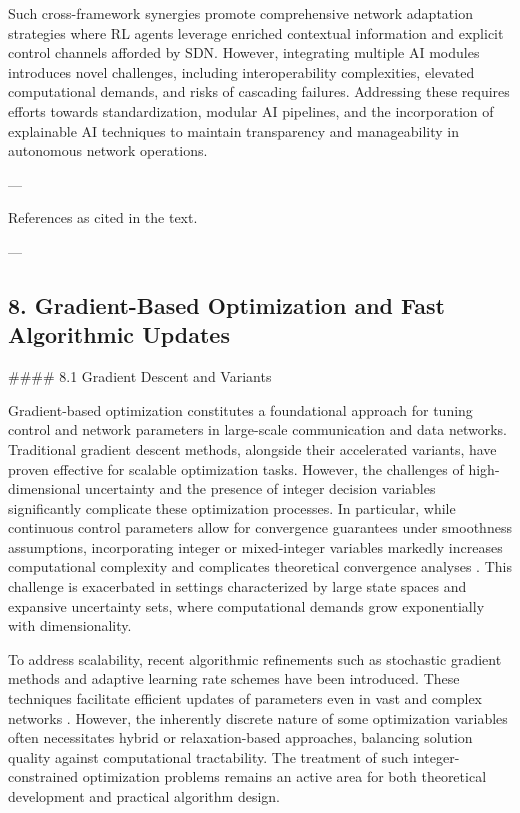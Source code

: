 \documentclass[11pt]{article}
\begin{document}
\begin{itemize}
Such cross-framework synergies promote comprehensive network adaptation strategies where RL agents leverage enriched contextual information and explicit control channels afforded by SDN. However, integrating multiple AI modules introduces novel challenges, including interoperability complexities, elevated computational demands, and risks of cascading failures. Addressing these requires efforts towards standardization, modular AI pipelines, and the incorporation of explainable AI techniques to maintain transparency and manageability in autonomous network operations.

---

References as cited in the text.

---

\subsection{8. Gradient-Based Optimization and Fast Algorithmic Updates}

#### 8.1 Gradient Descent and Variants

Gradient-based optimization constitutes a foundational approach for tuning control and network parameters in large-scale communication and data networks. Traditional gradient descent methods, alongside their accelerated variants, have proven effective for scalable optimization tasks. However, the challenges of high-dimensional uncertainty and the presence of integer decision variables significantly complicate these optimization processes. In particular, while continuous control parameters allow for convergence guarantees under smoothness assumptions, incorporating integer or mixed-integer variables markedly increases computational complexity and complicates theoretical convergence analyses \cite{ref36}. This challenge is exacerbated in settings characterized by large state spaces and expansive uncertainty sets, where computational demands grow exponentially with dimensionality.

To address scalability, recent algorithmic refinements such as stochastic gradient methods and adaptive learning rate schemes have been introduced. These techniques facilitate efficient updates of parameters even in vast and complex networks \cite{ref1,ref9,ref10,ref11,ref12,ref14,ref16}. However, the inherently discrete nature of some optimization variables often necessitates hybrid or relaxation-based approaches, balancing solution quality against computational tractability. The treatment of such integer-constrained optimization problems remains an active area for both theoretical development and practical algorithm design.


\end{itemize}
\end{document}

